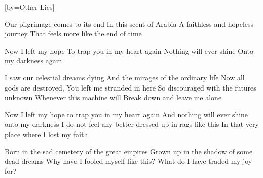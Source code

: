 [by={Other Lies}]

  \chordsoff

  \beginverse  
  Our pilgrimage comes to its end
  In this scent of Arabia
  A faithless and hopeless journey
  That feels more like the end of time
  \endverse

  \beginchorus
  
  Now I left my hope
  To trap you in my heart again
  Nothing will ever shine
  Onto my darkness again
  \endchorus

  \beginverse
  I saw our celestial dreams dying 
  And the mirages of the ordinary life 
  Now all gods are destroyed,
  You left me stranded in here
  So discouraged with the futures unknown
  Whenever this machine will
  Break down and leave me alone
  \endverse

  \beginchorus  
  Now I left my hope to trap you in my heart again
  And nothing will ever shine onto my darkness
  I do not feel any better dressed up in rags like this
  In that very place where I lost my faith 
  \endchorus



  \beginverse
  Born in the sad cemetery of the great empires
  Grown up in the shadow of some dead dreams
  Why have I fooled myself like this?
  What do I have traded my joy for?
  \endverse

\endsong
